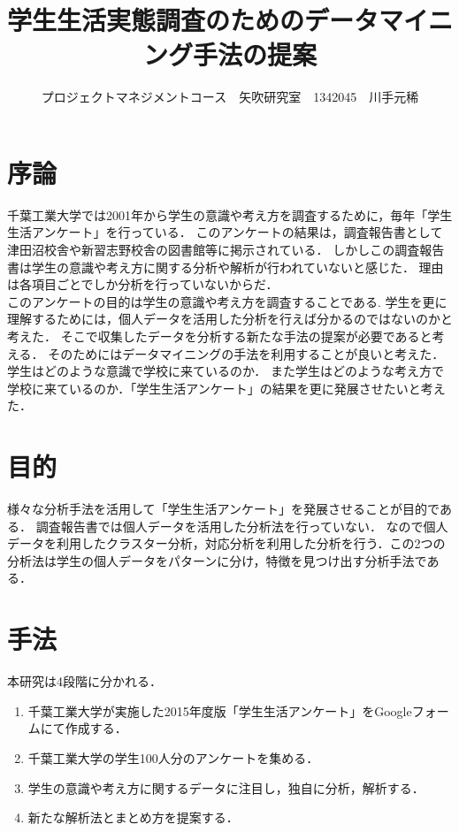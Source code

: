 \documentclass[uplatex,twocolumn,dvipdfmx]{jsarticle}
\title{\vspace{-5mm}\fontsize{14pt}{0pt}\selectfont 学生生活実態調査のためのデータマイニング手法の提案}
\author{\normalsize プロジェクトマネジメントコース　矢吹研究室　1342045　川手元稀}
\date{}
\begin{document}
\fontsize{10.5pt}{\baselineskip}\selectfont
\maketitle





\section{序論}
千葉工業大学では2001年から学生の意識や考え方を調査するために，毎年「学生生活アンケート」を行っている．
このアンケートの結果は，調査報告書として津田沼校舎や新習志野校舎の図書館等に掲示されている．
しかしこの調査報告書は学生の意識や考え方に関する分析や解析が行われていないと感じた．
理由は各項目ごとでしか分析を行っていないからだ．
\\このアンケートの目的は学生の意識や考え方を調査することである\cite{a}.
学生を更に理解するためには，個人データを活用した分析を行えば分かるのではないのかと考えた．
そこで収集したデータを分析する新たな手法の提案が必要であると考える．
そのためにはデータマイニングの手法を利用することが良いと考えた．学生はどのような意識で学校に来ているのか．
また学生はどのような考え方で学校に来ているのか．「学生生活アンケート」の結果を更に発展させたいと考えた．


\section{目的}
様々な分析手法を活用して「学生生活アンケート」を発展させることが目的である．
調査報告書では個人データを活用した分析法を行っていない．
なので個人データを利用したクラスター分析，対応分析を利用した分析を行う．この2つの分析法は学生の個人データをパターンに分け，特徴を見つけ出す分析手法である\cite{b}．


\section{手法}
本研究は4段階に分かれる．

\begin{enumerate}
\item 千葉工業大学が実施した2015年度版「学生生活アンケート」をGoogleフォームにて作成する．
\item 千葉工業大学の学生100人分のアンケートを集める．
\item 学生の意識や考え方に関するデータに注目し，独自に分析，解析する．
\item 新たな解析法とまとめ方を提案する．
\end{enumerate}
\end{document}
